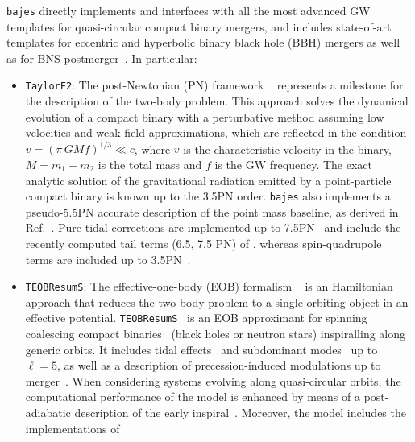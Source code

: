 \documentclass[prd,aps,twocolumn,a4paper,showkeys,nofootinbib,floatfix]{revtex4-1}
\newcommand{\bajes}{{\tt bajes}}
\begin{document}
{\bajes} directly implements and interfaces 
	with all the most advanced GW
  templates for quasi-circular compact binary mergers, and includes
  state-of-art templates for eccentric and hyperbolic binary black hole (BBH) mergers
  \cite{Chiaramello:2020ehz,Nagar:2020xsk} as
  well as for BNS postmerger~\cite{Breschi:2019srl}. In particular:
\begin{itemize}
	\item {\tt TaylorF2}: The post-Newtonian (PN) framework
	~\cite{Blanchet:1989fg,Faye:2012we,Levi:2015ixa,Levi:2015uxa,Mishra:2015bqa,Levi:2016ofk}
	represents a milestone for the description of the two-body problem.
	This approach solves the dynamical evolution 
	of a compact binary with a perturbative method 
	assuming low velocities and weak field approximations,
	which are reflected in the condition $v=(\pi\, G M f)^{1/3}\ll c$,
	where $v$ is the characteristic velocity in the binary,
	$M=m_1+m_2$ is the total mass and $f$ is the GW frequency.
	The exact analytic solution of the gravitational radiation emitted
	by a point-particle compact binary is known up to the 3.5PN
        order.
	{\bajes} also implements a pseudo-5.5PN accurate description of the point mass baseline, as 
	derived in Ref.~\cite{Messina:2019uby}.
	Pure tidal corrections are implemented up to
        7.5PN~\cite{Vines:2011ud,Damour:2012yf} and include the 
        recently computed tail terms (6.5, 7.5 PN) of \cite{Henry:2020ski},
	whereas spin-quadrupole terms are included up to 3.5PN~\cite{Nagar:2018plt}.    
	\item {\tt TEOBResumS}: The effective-one-body (EOB) formalism
	~\cite{Buonanno:1998gg, Buonanno:2000ef,Damour:2000we,Damour:2001tu,Damour:2008qf,Damour:2015isa,Bini:2019nra,Bini:2020wpo,Bini:2020nsb} 
	is an Hamiltonian approach that reduces the two-body problem to
	a single orbiting object in an effective potential.
	{\tt TEOBResumS}~\cite{Nagar:2018zoe} is an EOB
	approximant for spinning coalescing compact binaries~\cite{Damour:2014sva,Nagar:2017jdw} (black holes or neutron stars)
	inspiralling along generic orbits. 
	It includes 
	tidal effects~\cite{Bini:2014zxa, Bernuzzi:2014owa, Akcay:2018yyh} 
	and subdominant modes~\cite{Nagar:2019wds, Nagar:2020pcj} up to $\ell =5$, as well as a
	description of precession-induced modulations up to merger~\cite{Akcay:2020qrj}. 
	When considering systems evolving along quasi-circular orbits, the computational performance of 
	the model is enhanced by means of a post-adiabatic description 
	of the early inspiral~\cite{Nagar:2018gnk}. 
	Moreover, the model includes the implementations of 

\end{itemize}
\end{document}
